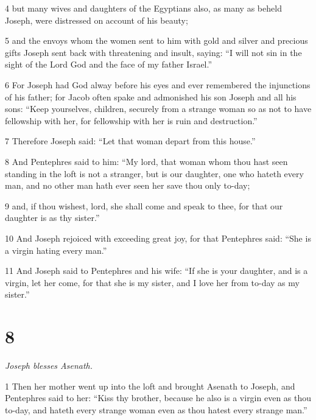 \par 4 but many wives and daughters of the Egyptians also, as many as beheld Joseph, were distressed on account of his beauty; 

\par 5 and the envoys whom the women sent to him with gold and silver and precious gifts Joseph sent back with threatening and insult, saying: “I will not sin in the sight of the Lord God and the face of my father Israel.” 

\par 6 For Joseph had God alway before his eyes and ever remembered the injunctions of his father; for Jacob often spake and admonished his son Joseph and all his sons: “Keep yourselves, children, securely from a strange woman so as not to have fellowship with her, for fellowship with her is ruin and destruction.” 

\par 7 Therefore Joseph said: “Let that woman depart from this house.” 

\par 8 And Pentephres said to him: “My lord, that woman whom thou hast seen standing in the loft is not a stranger, but is our daughter, one who hateth every man, and no other man hath ever seen her save thou only to-day; 

\par 9 and, if thou wishest, lord, she shall come and speak to thee, for that our daughter is as thy sister.” 

\par 10 And Joseph rejoiced with exceeding great joy, for that Pentephres said: “She is a virgin hating every man.” 

\par 11 And Joseph said to Pentephres and his wife: “If she is your daughter, and is a virgin, let her come, for that she is my sister, and I love her from to-day as my sister.”

\chapter{8}


\par \textit{Joseph blesses Asenath.}

\par 1 Then her mother went up into the loft and brought Asenath to Joseph, and Pentephres said to her: “Kiss thy brother, because he also is a virgin even as thou to-day, and hateth every strange woman even as thou hatest every strange man.” 

